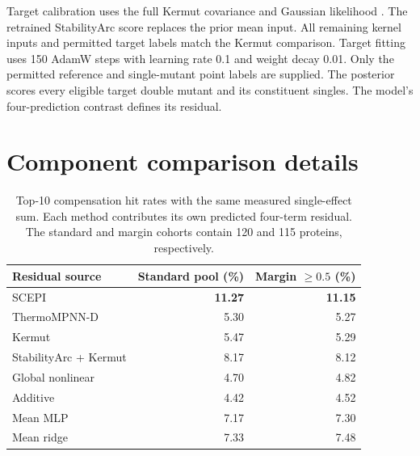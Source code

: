 \documentclass{llncs}
\begin{document}
Target calibration uses the full Kermut covariance and Gaussian likelihood \citep{groth2024}. The retrained StabilityArc score replaces the prior mean input. All remaining kernel inputs and permitted target labels match the Kermut comparison. Target fitting uses 150 AdamW steps with learning rate 0.1 and weight decay 0.01. Only the permitted reference and single-mutant point labels are supplied. The posterior scores every eligible target double mutant and its constituent singles. The model's four-prediction contrast defines its residual.

\section{Component comparison details}

\begin{table}[H]
\centering
\caption{Top-10 compensation hit rates with the same measured single-effect sum. Each method contributes its own predicted four-term residual. The standard and margin cohorts contain 120 and 115 proteins, respectively.}
\label{tab:commonmain}
\begin{tabular}{lrr}
\toprule
Residual source & Standard pool (\%) & Margin $\geq0.5$ (\%) \\
\midrule
SCEPI & \textbf{11.27} & \textbf{11.15} \\
ThermoMPNN-D & 5.30 & 5.27 \\
Kermut & 5.47 & 5.29 \\
StabilityArc + Kermut & 8.17 & 8.12 \\
Global nonlinear & 4.70 & 4.82 \\
Additive & 4.42 & 4.52 \\
Mean MLP & 7.17 & 7.30 \\
Mean ridge & 7.33 & 7.48 \\
\bottomrule
\end{tabular}
\end{table}
\end{document}

